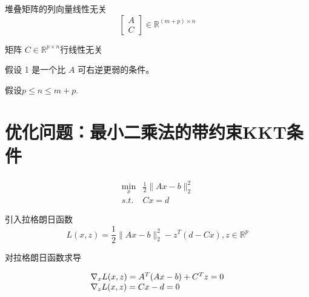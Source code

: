 \begin{proposition}
    \label{prop:assumption-1}

    堆叠矩阵的列向量线性无关
$$
\left[\begin{array}{l}
A \\
C
\end{array}\right] \in \mathbb{R}^{(m+p) \times n}
$$
\end{proposition}

\begin{proposition}
    \label{prop:assumption-2}
    矩阵 $ C \in \mathbb{R}^{p \times n} $行线性无关

\end{proposition}

假设 1 是一个比 $ A $ 可右逆更弱的条件。 

假设$ p \leq n \leq m+p $.

\section{优化问题：最小二乘法的带约束KKT条件}

\begin{problem}
    $$\begin{aligned}
        \min _{x} & \frac{1}{2}\|A x-b\|_{2}^{2}\\
        s.t. & C x=d
    \end{aligned}$$
\end{problem}


引入拉格朗日函数
$$
L(x, z)=\frac{1}{2}\|A x-b\|_{2}^{2}-z^{T}(d-C x), z \in \mathbb{R}^{p}
$$

对拉格朗日函数求导


\begin{equation}
    \centering
    \label{eqn:kkt-deriavative}
    \begin{array}{l}
\nabla_{x} L(x, z)=A^{T}(A x-b)+C^{T} z=0 \\
\nabla_{z} L(x, z)=C x-d=0
\end{array}
\end{equation}



